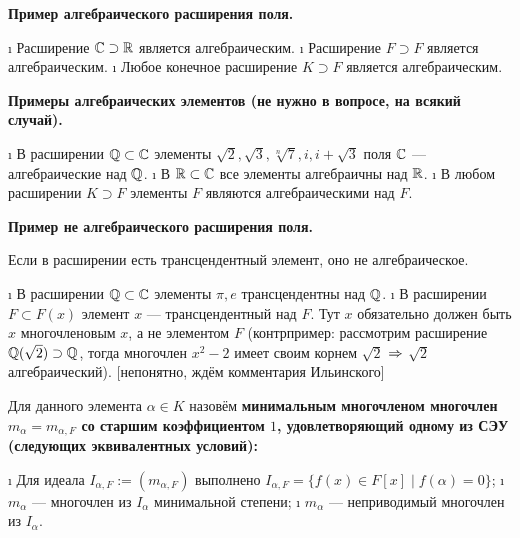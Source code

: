 \begin{defn}
\bf{Пример алгебраического расширения поля.}

\begin{itemize}
\tightlist
\i
  Расширение \(\mathbb{C} \supset \mathbb{R}\) является алгебраическим.
\i
  Расширение \(F \supset F\) является алгебраическим.
\i
  Любое конечное расширение \(K \supset F\) является алгебраическим.
\end{itemize}

\bf{Примеры алгебраических элементов (не нужно в вопросе, на всякий случай).}

\begin{itemize}
\tightlist
\i
  В расширении \(\mathbb{Q} \subset \mathbb{C}\) элементы \(\sqrt{2}, \sqrt{3}, \sqrt[n]{7}, i, i+\sqrt{3}\) поля \(\mathbb{C}\) --- алгебраические над \(\mathbb{Q}\).
\i
  В \(\mathbb{R} \subset \mathbb{C}\) все элементы алгебраичны над \(\mathbb{R}\).
\i
  В любом расширении \(K \supset F\) элементы \(F\) являются алгебраическими над \(F\).
\end{itemize}

\end{defn}

\begin{defn}
\bf{Пример не алгебраического расширения поля.}

Если в расширении есть трансцендентный элемент, оно не алгебраическое.

\begin{itemize}
\tightlist
\i
  В расширении \(\mathbb{Q} \subset \mathbb{C}\) элементы \(\pi, e\) трансцендентны над \(\mathbb{Q}\).
\i
  В расширении \(F \subset F(x)\) элемент \(x\) --- трансцендентный над \(F\). Тут \(x\) обязательно должен быть \(x\) многочленовым \(x\), а не элементом \(F\) (контрпример: рассмотрим расширение \(\mathbb{Q}(\sqrt{2}) \supset \mathbb{Q}\), тогда многочлен \(x^2-2\) имеет своим корнем \(\sqrt{2}\) \(\Rightarrow\) \(\sqrt{2}\) алгебраический). {[}непонятно, ждём комментария Ильинского{]}
\end{itemize}

\end{defn}

\begin{defn}
Для данного элемента \(\alpha \in K\) назовём \bf{минимальным многочленом} многочлен \(m_{\alpha} = m_{\alpha,F}\) со старшим коэффициентом \(1\), удовлетворяющий одному из СЭУ (следующих эквивалентных условий):

\begin{enumerate}
\def\labelenumi{\arabic{enumi}.}
\tightlist
\i
  Для идеала \(I_{\alpha, F} := (m_{\alpha, F})\) выполнено \(I_{\alpha,F} = \{f(x) \in F[x] \mid f(\alpha)=0\}\);
\i
  \(m_{\alpha}\) --- многочлен из \(I_{\alpha}\) минимальной степени;
\i
  \(m_{\alpha}\) --- неприводимый многочлен из \(I_{\alpha}\).
\end{enumerate}

\end{defn}

